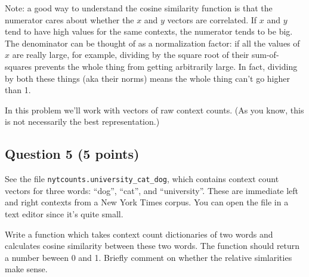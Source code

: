 \documentclass[11pt]{article}
\begin{document}
Note: a good way to understand the cosine similarity function is that
the numerator cares about whether the \(x\) and \(y\) vectors are
correlated. If \(x\) and \(y\) tend to have high values for the same
contexts, the numerator tends to be big. The denominator can be thought
of as a normalization factor: if all the values of \(x\) are really
large, for example, dividing by the square root of their sum-of-squares
prevents the whole thing from getting arbitrarily large. In fact,
dividing by both these things (aka their norms) means the whole thing
can't go higher than 1.

In this problem we'll work with vectors of raw context counts. (As you
know, this is not necessarily the best representation.)

    \subsection{Question 5 (5 points)}\label{question-5-5-points}

See the file \texttt{nytcounts.university\_cat\_dog}, which contains
context count vectors for three words: ``dog'', ``cat'', and
``university''. These are immediate left and right contexts from a New
York Times corpus. You can open the file in a text editor since it's
quite small.

Write a function which takes context count dictionaries of two words and
calculates cosine similarity between these two words. The function
should return a number beween 0 and 1. Briefly comment on whether the
relative simlarities make sense.
\end{document}
